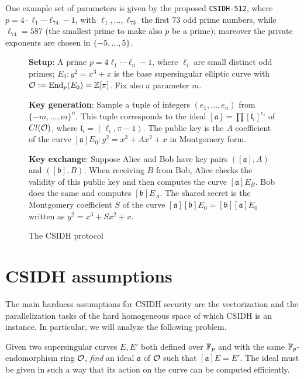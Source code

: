 One example set of parameters is given by the proposed \texttt{CSIDH-512}, where $p=4\cdot\ell_1\cdots\ell_{74}-1$, with $\ell_1,\dots,\ell_{73}$ the first $73$ odd prime numbers, while $\ell_{74}=587$ (the smallest prime to make also $p$ be a prime); moreover the private exponents are chosen in $\{ -5,\dots,5 \}$.

\begin{figure}
    \begin{framed}
        \textbf{Setup}: A prime $p=4\ell_1\cdots\ell_n-1$, where $\ell_i$ are small distinct odd primes; $E_0:y^2=x^3+x$ is the base supersingular elliptic curve with $\mathcal{O}:=\operatorname{End}_p(E_0)=\mathbb{Z}[\pi]$. Fix also a parameter $m$.
        
        \textbf{Key generation}: Sample a tuple of integers $(e_1,\dots,e_n)$ from $\{ -m,\dots,m \}^n$. This tuple corresponds to the ideal $[\mathfrak{a}] = \prod [\mathfrak{l}_i]^{e_i}$ of $Cl(\mathcal{O})$, where $\mathfrak{l}_i=(\ell_i, \pi-1)$. The public key is the $A$ coefficient of the curve $[\mathfrak{a}]E_0:y^2=x^3+Ax^2+x$ in Montgomery form.
        
        \textbf{Key exchange}: Suppose Alice and Bob have key pairs $([\mathfrak{a}], A)$ and $([\mathfrak{b}], B)$. When receiving $B$ from Bob, Alice checks the validity of this public key and then computes the curve $[\mathfrak{a}]E_B$. Bob does the same and computes $[\mathfrak{b}]E_A$. The shared secret is the Montgomery coefficient $S$ of the curve $[\mathfrak{a}][\mathfrak{b}]E_0=[\mathfrak{b}][\mathfrak{a}]E_0$ written as $y^2=x^3+Sx^2+x$.
    \end{framed}
    \caption{The CSIDH protocol}
    \label{prot_CSIDH}
\end{figure}


\section{CSIDH assumptions}
The main hardness assumptions for CSIDH security are the vectorization and the parallelization tasks of the hard homogeneous space of which CSIDH is an instance. In particular, we will analyze the following problem.

\begin{problem}\label{problem_csidh}
    Given two supersingular curves $E,E'$ both defined over $\mathbb{F}_p$ and with the same $\mathbb{F}_p$-endomorphism ring $\mathcal{O}$, \emph{find} an ideal $\mathfrak{a}$ of $\mathcal{O}$ such that $[\mathfrak{a}]E=E'$. The ideal must be given in such a way that its action on the curve can be computed efficiently.
\end{problem}

